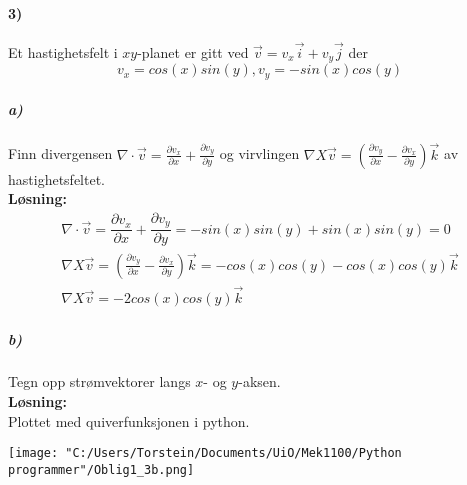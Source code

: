 \documentclass[11pt, A4paper,norsk]{article}
\begin{document}
		\paragraph{3)}
			\begin{flushleft}
Et hastighetsfelt i $xy$-planet er gitt ved $\vec{v} = v_x\vec{i} + v_y\vec{j}$ der
$$v_x = cos(x) sin(y), v_y = - sin(x) cos(y)$$
			\end{flushleft}
			\subparagraph{a)}
				\begin{flushleft}
Finn divergensen $\nabla \cdot \vec{v} = \frac{\partial v_x}{\partial x} + \frac{\partial v_y}{\partial y}$ og virvlingen $\nabla X \vec{v} = (\frac{\partial v_y}{\partial x} - \frac{\partial v_x}{\partial y}) \vec{k}$ av hastighetsfeltet. \\
\vspace{1mm}
\textbf{Løsning:} \\
\vspace{1mm}
					\begin{align}
\nabla \cdot \vec{v} = \dfrac{\partial v_x}{\partial x} + \dfrac{\partial v_y}{\partial y} = -sin(x)sin(y) + sin(x)sin(y) = 0 \nonumber \\
\nabla X \vec{v} = (\frac{\partial v_y}{\partial x} - \frac{\partial v_x}{\partial y}) \vec{k} = -cos(x)cos(y) - cos(x)cos(y)\vec{k} \nonumber \\
\nabla X \vec{v} = -2cos(x)cos(y) \vec{k} \nonumber
					\end{align}
				\end{flushleft}












			\subparagraph{b)}
				\begin{flushleft}
Tegn opp strømvektorer langs $x$- og $y$-aksen. \\
\vspace{1mm}
\textbf{Løsning:} \\
\vspace{1mm}
Plottet med quiverfunksjonen i python.

\texttt{[image: "C:/Users/Torstein/Documents/UiO/Mek1100/Python programmer"/Oblig1\_3b.png]}
				\end{flushleft}
\end{document}
